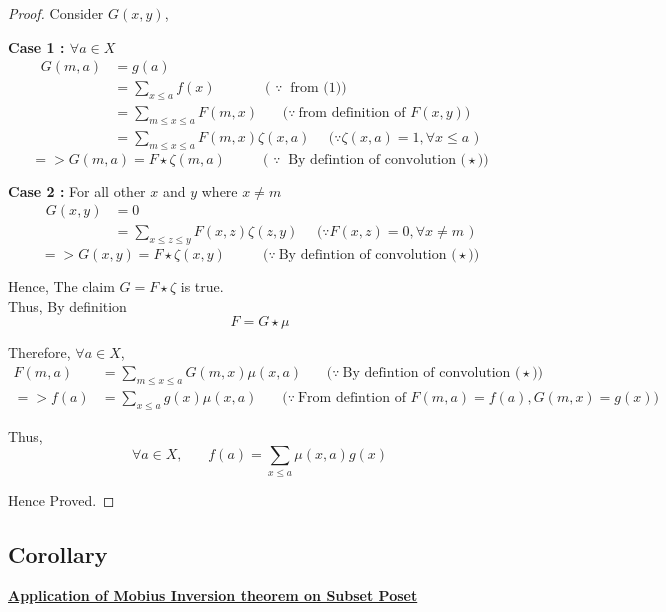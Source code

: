 \begin{proof}
\noindent Consider $G(x,y)$,

\textbf{Case 1 : $\forall a \in X$}
\begin{align*}
    G(m,a) &= g(a)\\
    &= \sum_{x \le a} f(x) ~~~~~~~~~~~~~~~~ \textrm{( $\because~$ from (1))}\\
    &= \sum_{m \le x \le a} F(m,x) ~~~~~~~~ \textrm{($\because~$from definition of $F(x,y)$)}\\
    &= \sum_{m \le x \le a} F(m,x) \zeta(x,a) ~~~~~~\textrm{($\because \zeta (x,a) = 1, \forall x \le a$ )}
\end{align*}
$$=> \boxed{G(m,a) = F \star \zeta (m,a)} ~~~~~~~~~~~~ \textrm{( $\because~$ By defintion of convolution ($\star$))}$$

\textbf{Case 2 :} For all other $x$ and $y$ where $x \ne m$
\begin{align*}
    G(x,y) &= 0\\
    &= \sum_{x \le z \le y} F(x,z) \zeta(z,y) ~~~~~~\textrm{($\because F(x,z) = 0, \forall x \ne m$ )}
\end{align*}
$$=> \boxed{G(x,y) = F \star \zeta (x,y)} ~~~~~~~~~~~~ \textrm{($\because~$By defintion of convolution ($\star$))}$$

\noindent Hence, The claim $G = F \star \zeta $ is true.\\

\noindent Thus, By definition
$$\boxed{F = G \star \mu}$$

\noindent Therefore, $\forall a \in X$,
\begin{align*}
    F(m,a) &= \sum_{m \le x \le a} G(m,x) \mu(x,a) ~~~~~~~~ \textrm{($\because~$By defintion of convolution ($\star$))}\\
 => f(a)  &=\sum_{x \le a} g(x) \mu(x,a) ~~~~~~~~ \textrm{($\because~$From defintion of $F(m,a) = f(a), G(m,x) = g(x)$)}
\end{align*}

\noindent Thus,
$$\forall a \in X, ~~~~~~~~f(a)  = \sum\limits_{x \le a} \mu(x,a) g(x)$$

Hence Proved.

\end{proof}

\subsection{Corollary}

\noindent \underline{\textbf{Application of Mobius Inversion theorem on Subset Poset}}\\

